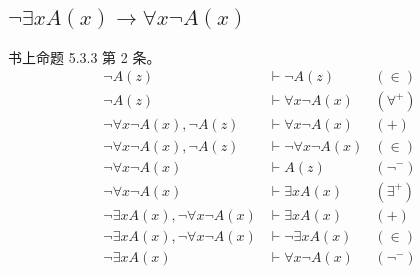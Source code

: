 \documentclass[UTF8]{ctexart}
\begin{document}
    \subsection{$\lnot \exists x A(x) \to \forall x \lnot A(x)$}

    书上命题 5.3.3 第 2 条。
    \begin{align*}
        \lnot A(z) & \vdash \lnot A(z) & (\in) \\
        \lnot A(z) & \vdash \forall x \lnot A(x) & (\forall^{+}) \\
        \lnot \forall x \lnot A(x), \lnot A(z) & \vdash \forall x \lnot A(x) & (+) \\
        \lnot \forall x \lnot A(x), \lnot A(z) & \vdash \lnot \forall x \lnot A(x) & (\in) \\
        \lnot \forall x \lnot A(x) & \vdash A(z) & (\lnot^{-}) \\
        \lnot \forall x \lnot A(x) & \vdash \exists x A(x) & (\exists^{+}) \\
        \lnot \exists x A(x), \lnot \forall x \lnot A(x) & \vdash \exists x A(x) & (+) \\
        \lnot \exists x A(x), \lnot \forall x \lnot A(x) & \vdash \lnot \exists x A(x) & (\in) \\
        \lnot \exists x A(x) & \vdash \forall x \lnot A(x) & (\lnot^{-})
    \end{align*}
\end{document}
